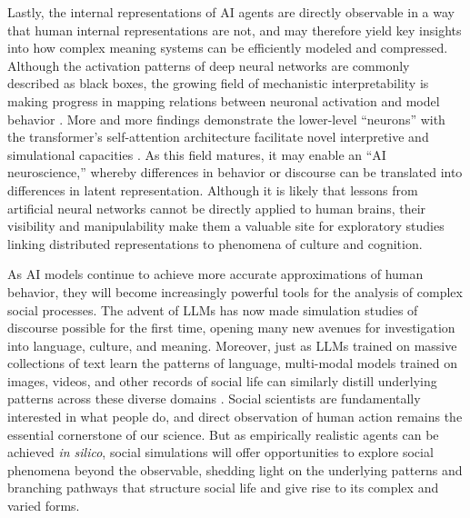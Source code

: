 \documentclass{article}
\begin{document}
Lastly, the internal representations of AI agents are directly
observable in a way that human internal representations are not, and may
therefore yield key insights into how complex meaning systems can be
efficiently modeled and compressed. Although the activation patterns of
deep neural networks are commonly described as black boxes, the growing
field of mechanistic interpretability is making progress in mapping
relations between neuronal activation and model behavior
\parencite{Bills2023-db, Elhage2022-bh}. More and more findings demonstrate the lower-level
``neurons'' with the transformer's self-attention architecture
facilitate novel interpretive and simulational capacities
\parencite{Hendel2023-ij}. As this field matures, it may enable
an ``AI neuroscience,'' whereby differences in behavior or discourse can
be translated into differences in latent representation. Although it is
likely that lessons from artificial neural networks cannot be directly
applied to human brains, their visibility and manipulability make them a
valuable site for exploratory studies linking distributed
representations to phenomena of culture and cognition.

As AI models continue to achieve more accurate approximations of human
behavior, they will become increasingly powerful tools for the analysis
of complex social processes. The advent of LLMs has now made simulation
studies of discourse possible for the first time, opening many new
avenues for investigation into language, culture, and meaning. Moreover,
just as LLMs trained on massive collections of text learn the patterns
of language, multi-modal models trained on images, videos, and other
records of social life can similarly distill underlying patterns across
these diverse domains
\parencite{Guilbeault2024-wz, Ludwig2024-nl}. Social scientists are fundamentally
interested in what people do, and direct observation of human action
remains the essential cornerstone of our science. But as empirically
realistic agents can be achieved \emph{in silico}, social simulations
will offer opportunities to explore social phenomena beyond the
observable, shedding light on the underlying patterns and branching
pathways that structure social life and give rise to its complex and
varied forms.

\newpage
\normalsize
\printbibliography
\end{document}
